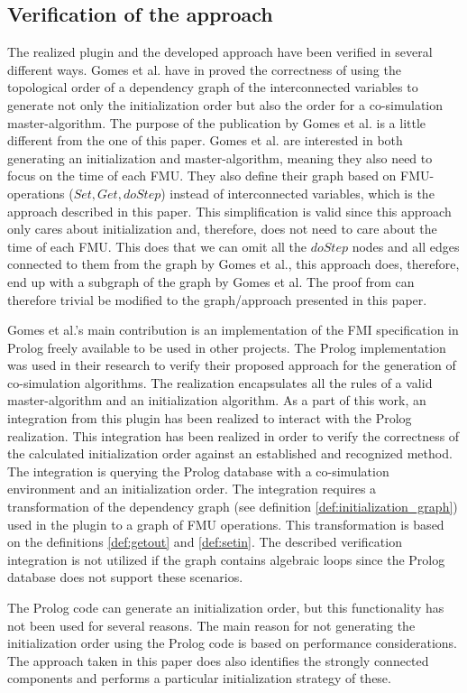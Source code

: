 \subsection{Verification of the approach}
The realized plugin and the developed approach have been verified in several different ways. Gomes et al. have in \cite{gomes_lucio_vangheluwe_2019} proved the correctness of using the topological order of a dependency graph of the interconnected variables to generate not only the initialization order but also the order for a co-simulation master-algorithm. The purpose of the publication by Gomes et al. is a little different from the one of this paper. Gomes et al. are interested in both generating an initialization and master-algorithm, meaning they also need to focus on the time of each FMU. They also define their graph based on FMU-operations ($Set, Get, doStep$) instead of interconnected variables, which is the approach described in this paper. This simplification is valid since this approach only cares about initialization and, therefore, does not need to care about the time of each FMU. This does that we can omit all the $doStep$ nodes and all edges connected to them from the graph by Gomes et al., this approach does, therefore, end up with a subgraph of the graph by Gomes et al. The proof from \cite{gomes_lucio_vangheluwe_2019} can therefore trivial be modified to the graph/approach presented in this paper.

Gomes et al.'s main contribution is an implementation of the FMI specification in Prolog freely available to be used in other projects. The Prolog implementation was used in their research to verify their proposed approach for the generation of co-simulation algorithms. The realization encapsulates all the rules of a valid master-algorithm and an initialization algorithm. As a part of this work, an integration from this plugin has been realized to interact with the Prolog realization. This integration has been realized in order to verify the correctness of the calculated initialization order against an established and recognized method. The integration is querying the Prolog database with a co-simulation environment and an initialization order. The integration requires a transformation of the dependency graph (see definition \ref{def:initialization_graph}) used in the plugin to a graph of FMU operations. This transformation is based on the definitions \ref{def:getout} and \ref{def:setin}. The described verification integration is not utilized if the graph contains algebraic loops since the Prolog database does not support these scenarios.

The Prolog code can generate an initialization order, but this functionality has not been used for several reasons. The main reason for not generating the initialization order using the Prolog code is based on performance considerations. The approach taken in this paper does also identifies the strongly connected components and performs a particular initialization strategy of these.